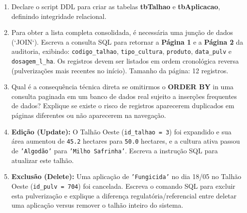 \documentclass[12pt,a4paper]{article}
\newcommand{\resposta}[1]{}
\begin{document}
\begin{center}
{%
    }
\end{center}

\vspace{0.4cm}

\begin{enumerate}[label=\textbf{\alph*)}]
    \item Declare o script DDL para criar as tabelas \textbf{tbTalhao} e \textbf{tbAplicacao}, definindo integridade relacional.
    \resposta{5cm}
    
    \item Para obter a lista completa consolidada, é necessária uma junção de dados (`JOIN`). Escreva a consulta SQL para retornar a \textbf{Página 1} e a \textbf{Página 2} da auditoria, exibindo: \texttt{codigo\_talhao}, \texttt{tipo\_cultura}, \texttt{produto}, \texttt{data\_pulv} e \texttt{dosagem\_l\_ha}. Os registros devem ser listados em ordem cronológica reversa (pulverizações mais recentes no início). Tamanho da página: 12 registros.
    \resposta{4cm}

    \item Qual é a consequência técnica direta se omitirmos o \textbf{ORDER BY} in uma consulta paginada em um banco de dados real sujeito a inserções frequentes de dados? Explique se existe o risco de registros aparecerem duplicados em páginas diferentes ou não aparecerem na navegação.
    \resposta{2.5cm}

    \item \textbf{Edição (Update):} O Talhão Oeste (\texttt{id\_talhao = 3}) foi expandido e sua área aumentou de \texttt{45.2} hectares para \texttt{50.0} hectares, e a cultura ativa passou de \texttt{'Algodão'} para \texttt{'Milho Safrinha'}. Escreva a instrução SQL para atualizar este talhão.
    \resposta{2.5cm}

    \item \textbf{Exclusão (Delete):} Uma aplicação de \texttt{'Fungicida'} no dia 18/05 no Talhão Oeste (\texttt{id\_pulv = 704}) foi cancelada. Escreva o comando SQL para excluir esta pulverização e explique a diferença regulatória/referencial entre deletar uma aplicação versus remover o talhão inteiro do sistema.
    \resposta{3.5cm}
\end{enumerate}
\end{document}
